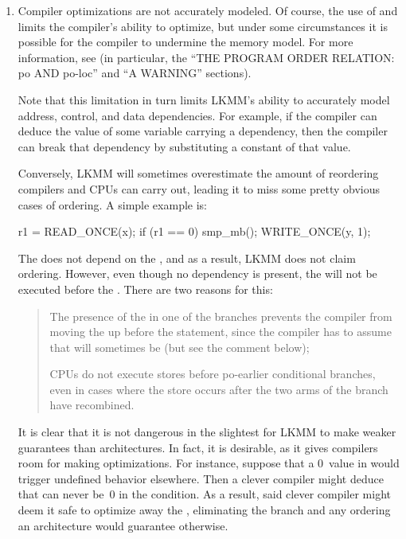 \begin{enumerate}
  \item	Compiler optimizations are not accurately modeled.
	Of course, the use of  and  limits
	the compiler's ability to optimize, but under some circumstances it
	is possible for the compiler to undermine the memory model.
	For more information, see 
	(in particular, the ``THE PROGRAM ORDER RELATION: po AND po-loc''
	and ``A WARNING'' sections).

	Note that this limitation in turn limits LKMM's ability to
	accurately model address, control, and data dependencies.
	For example, if the compiler can deduce the value of some variable
	carrying a dependency, then the compiler can break that dependency
	by substituting a constant of that value.

	Conversely, LKMM will sometimes overestimate the amount of
	reordering compilers and CPUs can carry out, leading it to miss
	some pretty obvious cases of ordering.  A simple example is:

\begin{VerbatimU}
		r1 = READ_ONCE(x);
		if (r1 == 0)
			smp_mb();
		WRITE_ONCE(y, 1);
\end{VerbatimU}

	The  does not depend on the , and as a
	result, LKMM does not claim ordering.
	However, even though no dependency is present, the 
	will not be executed before the .
	There are two reasons for this:

	\begin{quote}
                The presence of the  in one of the branches
                prevents the compiler from moving the 
                up before the  statement, since the compiler has
                to assume that  will sometimes be  (but see the
                comment below);

                CPUs do not execute stores before po-earlier conditional
                branches, even in cases where the store occurs after the
                two arms of the branch have recombined.
	\end{quote}

	It is clear that it is not dangerous in the slightest for LKMM to
	make weaker guarantees than architectures.
	In fact, it is desirable, as it gives compilers room for making
	optimizations.
	For instance, suppose that a 0~value in  would trigger undefined
	behavior elsewhere.
	Then a clever compiler might deduce that  can never be~0 in
	the  condition.
	As a result, said clever compiler might deem it safe to optimize
	away the , eliminating the branch and any ordering
	an architecture would guarantee otherwise.


\end{enumerate}
